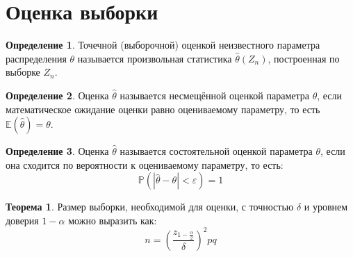 \documentclass[12pt]{article}
\theoremstyle{definition}
\newtheorem{theorem}{Теорема}[section]
\newtheorem{definition}{Определение}
\newcommand{\E}{\mathbb{E}}
\newcommand{\prob}{\mathbb{P}}
\begin{document}
\section{Оценка выборки}

\begin{definition}
    Точечной (выборочной) оценкой неизвестного параметра распределения $\theta$ называется произвольная статистика $\hat{\theta}(Z_n)$, построенная по выборке $Z_n$.
\end{definition}
\begin{definition}
    Оценка $\hat{\theta}$ называется несмещённой оценкой параметра $\theta$, если математическое ожидание оценки равно оцениваемому параметру, то есть $\E(\hat{\theta})=\theta$.
\end{definition}
\begin{definition}
    Оценка $\hat{\theta}$ называется состоятельной оценкой параметра $\theta$, если она сходится по вероятности к оцениваемому параметру, то есть:
    $$\prob(|\hat{\theta}-\theta|<\varepsilon)=1$$
\end{definition}
\begin{theorem}
    Размер выборки, необходимой для оценки, с точностью $\delta$ и уровнем доверия $1-\alpha$ можно выразить как:
    $$n=\left(\frac{z_{1-\frac{\alpha}{2}}}{\delta}\right)^2pq$$
\end{theorem}
\end{document}
